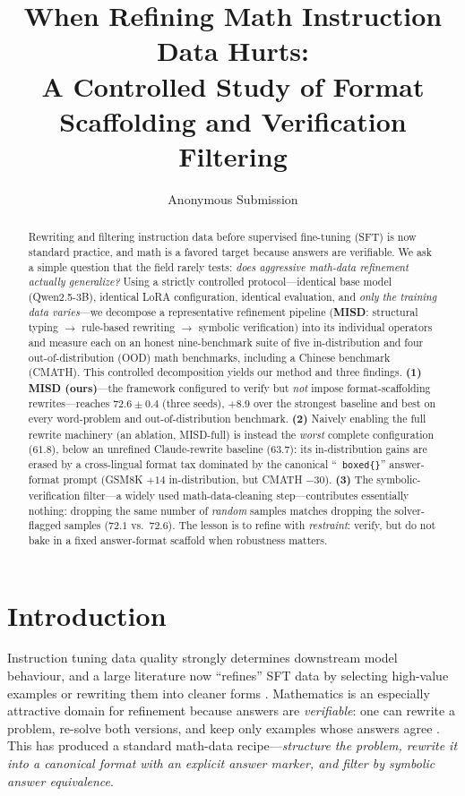 \documentclass[letterpaper]{article} %
\title{When Refining Math Instruction Data Hurts:\\A Controlled Study of Format Scaffolding and Verification Filtering}
\author{
    Anonymous Submission
}
\begin{document}
\maketitle

\begin{abstract}
Rewriting and filtering instruction data before supervised fine-tuning (SFT) is now standard practice, and math is a favored target because answers are verifiable. We ask a simple question that the field rarely tests: \emph{does aggressive math-data refinement actually generalize?} Using a strictly controlled protocol---identical base model (Qwen2.5-3B), identical LoRA configuration, identical evaluation, and \emph{only the training data varies}---we decompose a representative refinement pipeline (\textbf{MISD}: structural typing $\rightarrow$ rule-based rewriting $\rightarrow$ symbolic verification) into its individual operators and measure each on an honest nine-benchmark suite of five in-distribution and four out-of-distribution (OOD) math benchmarks, including a Chinese benchmark (CMATH).
This controlled decomposition yields our method and three findings. \textbf{(1)} \textbf{MISD (ours)}---the framework configured to verify but \emph{not} impose format-scaffolding rewrites---reaches $\mathbf{72.6 \pm 0.4}$ (three seeds), $\mathbf{+8.9}$ over the strongest baseline and best on every word-problem and out-of-distribution benchmark. \textbf{(2)} Naively enabling the full rewrite machinery (an ablation, MISD-full) is instead the \emph{worst} complete configuration ($61.8$), below an unrefined Claude-rewrite baseline ($63.7$): its in-distribution gains are erased by a cross-lingual format tax dominated by the canonical ``\texttt{ boxed\{\}}'' answer-format prompt (GSM8K $+14$ in-distribution, but CMATH $-30$). \textbf{(3)} The symbolic-verification filter---a widely used math-data-cleaning step---contributes essentially nothing: dropping the same number of \emph{random} samples matches dropping the solver-flagged samples ($72.1$ vs.\ $72.6$). The lesson is to refine with \emph{restraint}: verify, but do not bake in a fixed answer-format scaffold when robustness matters.
\end{abstract}

\section{Introduction}

Instruction tuning data quality strongly determines downstream model behaviour, and a large literature now ``refines'' SFT data by selecting high-value examples \citep{li2023quantity,li2024superfiltering,liu2023deita} or rewriting them into cleaner forms \citep{xu2023wizardlm}. Mathematics is an especially attractive domain for refinement because answers are \emph{verifiable}: one can rewrite a problem, re-solve both versions, and keep only examples whose answers agree \citep{lu2024mathgenie}. This has produced a standard math-data recipe---\textit{structure the problem, rewrite it into a canonical format with an explicit answer marker, and filter by symbolic answer equivalence}.
\end{document}
